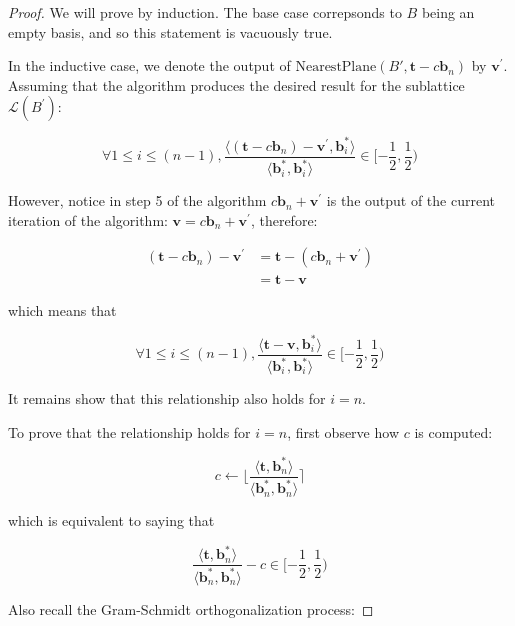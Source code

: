 \begin{proof}
    We will prove by induction. The base case correpsonds to $B$ being an empty basis, and so this statement is vacuously true.
    
    In the inductive case, we denote the output of $\text{NearestPlane}(B', \mathbf{t} - c\mathbf{b}_n)$ by $\mathbf{v}^\prime$. Assuming that the algorithm produces the desired result for the sublattice $\mathcal{L}(B^\prime)$:

    $$
    \forall 1 \leq i \leq (n-1), 
    \frac{
        \langle
            (\mathbf{t} - c\mathbf{b}_n) - \mathbf{v}^\prime, 
            \mathbf{b}_i^\ast
        \rangle
    }{
        \langle
            \mathbf{b}_i^\ast, \mathbf{b}_i^\ast
        \rangle
    } \in [-\frac{1}{2}, \frac{1}{2})
    $$

    However, notice in step 5 of the algorithm $c\mathbf{b}_n + \mathbf{v}^\prime$ is the output of the current iteration of the algorithm: $\mathbf{v} = c\mathbf{b}_n + \mathbf{v}^\prime$, therefore:

    $$
    \begin{aligned}
    (\mathbf{t} - c\mathbf{b}_n) - \mathbf{v}^\prime 
    &= \mathbf{t} - (c\mathbf{b}_n + \mathbf{v}^\prime) \\
    &= \mathbf{t} - \mathbf{v}
    \end{aligned}
    $$

    which means that

    $$
    \forall 1 \leq i \leq (n-1), 
    \frac{
        \langle
            \mathbf{t} - \mathbf{v}, 
            \mathbf{b}_i^\ast
        \rangle
    }{
        \langle
            \mathbf{b}_i^\ast, \mathbf{b}_i^\ast
        \rangle
    } \in [-\frac{1}{2}, \frac{1}{2})
    $$

    It remains show that this relationship also holds for $i = n$.

    To prove that the relationship holds for $i = n$, first observe how $c$ is computed:

    $$
    c \leftarrow \lfloor \frac{\langle\mathbf{t}, \mathbf{b}_n^\ast\rangle}{\langle\mathbf{b}_n^\ast, \mathbf{b}_n^\ast\rangle} \rceil
    $$

    which is equivalent to saying that

    $$
    \frac{
        \langle\mathbf{t}, \mathbf{b}_n^\ast\rangle
    }{
        \langle\mathbf{b}_n^\ast, \mathbf{b}_n^\ast\rangle
    }
    - c \in [-\frac{1}{2}, \frac{1}{2})
    $$

    Also recall the Gram-Schmidt orthogonalization process:


\end{proof}
